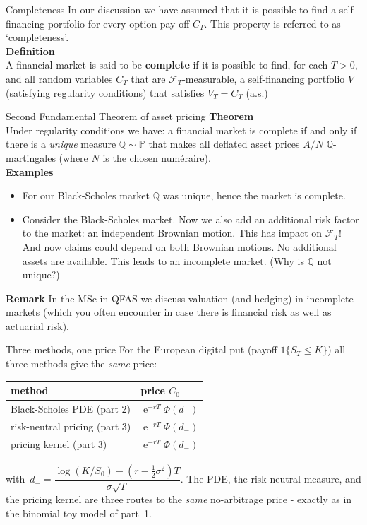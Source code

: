 \documentclass[pdf, handout]{beamer}
\newcommand{\e}{\operatorname{e}}
\begin{document}
\begin{frame}{Completeness}
In our discussion we have assumed that
it is possible to find a self-financing portfolio for every
option pay-off $C_T$. This property is referred to as `completeness'.
\\ 
\vspace{.5cm}
\textbf{Definition} \\
A financial market is said to be \textbf{complete} if it is possible
to find, for each $T>0$, and all random variables $C_T$ that are $\mathcal{F}_T$-measurable, a
self-financing portfolio $V$ (satisfying regularity conditions)
that satisfies $V_T=C_T$ (a.s.)
\end{frame}

\begin{frame}{Second Fundamental Theorem of asset pricing}
\textbf{Theorem} \\
Under regularity conditions we have:
a financial market 
is complete if and only if there is a \emph{unique}
measure $\mathbb{Q}\sim\mathbb{P}$ that makes 
all deflated asset prices $A/N$ $\mathbb{Q}$-martingales (where
$N$ is the chosen num\'{e}raire).
\\
\vspace{.5cm}
\textbf{Examples}
\begin{itemize}
\item 
For our Black-Scholes market $\mathbb{Q}$ was unique, hence the
market is complete.
\item Consider the Black-Scholes market. Now we also add an additional risk factor to the market: an independent Brownian 
motion. This has impact on $\mathcal{F}_T$! And now claims could depend on both Brownian motions. No additional assets are available.  This leads to an incomplete market. (Why is
$\mathbb{Q}$ not unique?)
\end{itemize}
\textbf{Remark} In the MSc in QFAS we discuss
valuation (and hedging) in incomplete markets
(which you often encounter in case there is financial risk
as well as actuarial risk). 
\end{frame}


\begin{frame}{Three methods, one price}
For the European digital put (payoff $1\{S_T\le K\}$) all three methods give the \emph{same} price:
\begin{center}
\renewcommand{\arraystretch}{1.25}
\begin{tabular}{ll}
\hline
method & price $C_0$\\
\hline
Black-Scholes PDE (part 2) & $\e^{-rT}\Phi(d_-)$\\
risk-neutral pricing (part 3) & $\e^{-rT}\Phi(d_-)$\\
pricing kernel (part 3) & $\e^{-rT}\Phi(d_-)$\\
\hline
\end{tabular}
\end{center}
with $\,d_-=\dfrac{\log(K/S_0)-(r-\frac12\sigma^2)T}{\sigma\sqrt{T}}$. The PDE, the risk-neutral measure, and the pricing kernel are three routes to the \emph{same} no-arbitrage price - exactly as in the binomial toy model of part~1.
\end{frame}
\end{document}
